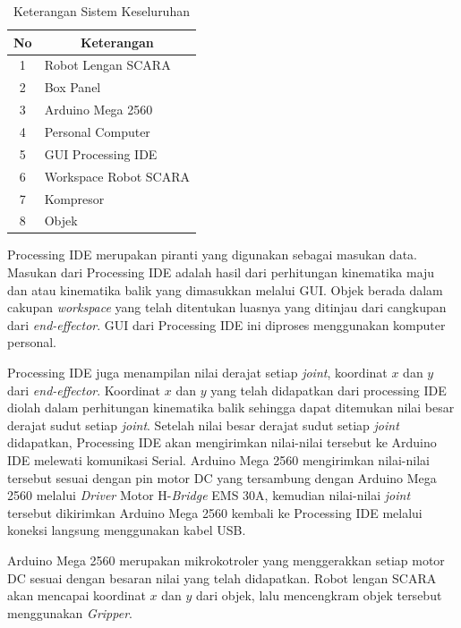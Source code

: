 \begin{table}[H]
	\centering
	\caption{Keterangan Sistem Keseluruhan}
\label{tbl.sistemkeseluruhan}
		\begin{tabular}{|c|l|}
			\hline
			\rowcolor[HTML]{9B9B9B} 
			No & \multicolumn{1}{c|}{\cellcolor[HTML]{9B9B9B}Keterangan} \\ \hline
			1  & Robot Lengan SCARA                                      \\ \hline
			2  & Box Panel                                               \\ \hline
			3  & Arduino Mega 2560                                       \\ \hline
			4  & Personal Computer                                       \\ \hline
			5  & GUI Processing IDE                                      \\ \hline
			6  & Workspace Robot SCARA                                   \\ \hline
			7  & Kompresor                                               \\ \hline
			8  & Objek                                                   \\ \hline
		\end{tabular}

\end{table}
Processing IDE merupakan piranti yang digunakan sebagai masukan data. Masukan dari Processing IDE adalah hasil dari perhitungan kinematika maju dan atau kinematika balik yang dimasukkan melalui GUI. Objek berada dalam cakupan \textit{workspace} yang telah ditentukan luasnya yang ditinjau dari cangkupan dari \textit{end-effector}. GUI dari Processing IDE ini diproses menggunakan komputer personal.  

Processing IDE juga menampilan nilai derajat setiap \textit{joint}, koordinat $x$ dan $y$ dari \textit{end-effector}. Koordinat $x$ dan $y$ yang telah didapatkan dari processing IDE diolah dalam perhitungan kinematika balik sehingga dapat ditemukan nilai besar derajat sudut setiap \textit{joint}. Setelah nilai besar derajat sudut setiap \textit{joint} didapatkan, Processing IDE akan mengirimkan nilai-nilai tersebut ke Arduino IDE melewati komunikasi Serial. Arduino Mega 2560 mengirimkan nilai-nilai tersebut sesuai dengan pin motor DC yang tersambung dengan Arduino Mega 2560 melalui \textit{Driver} Motor H-\textit{Bridge} EMS 30A, kemudian nilai-nilai \textit{joint}  tersebut dikirimkan Arduino Mega 2560 kembali ke Processing IDE melalui koneksi langsung menggunakan kabel USB.  

Arduino Mega 2560 merupakan mikrokotroler yang menggerakkan setiap motor DC sesuai dengan besaran nilai yang telah didapatkan. Robot lengan SCARA akan mencapai koordinat $x$ dan $y$ dari objek, lalu mencengkram objek tersebut menggunakan \textit{Gripper}.
